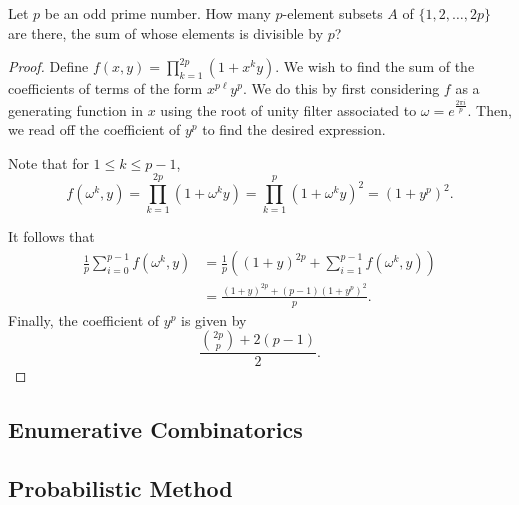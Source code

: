 \documentclass[11pt]{article}
\renewcommand{\>}{\rangle}
\newcommand{\<}{\langle}
\newcommand{\Var}{\operatorname{Var}}
\begin{document}
\begin{problem}[IMO 1995/6] Let $p$ be an odd prime number. How many $p$-element subsets $ A$ of $ \{1,2,\dots,2p\}$ are there, the sum of whose elements is divisible by $p$?
\end{problem}
\begin{proof}
Define $f(x, y) = \prod_{k=1}^{2p} (1 + x^k y)$.  We wish to find the sum of the coefficients of terms of the form $x^{p \ell} y^p$.  We do this by first considering $f$ as a generating function in $x$ using the root of unity filter associated to $\omega = e^{\frac{2\pi i }{p}}$.   Then, we read off the coefficient of $y^p$ to find the desired expression.

Note that for $1 \le k \le p-1$, 
$$f(\omega^k, y) = \prod_{k=1}^{2p} (1 + \omega^k y) = \prod_{k=1}^{p} (1 + \omega^k y)^2 = (1 + y^p)^2.$$

It follows that 
\begin{align*}
\frac{1}{p} \sum_{i=0}^{p-1} f(\omega^k, y) &= \frac{1}{p} \left ((1 +y)^{2p} + \sum_{i=1}^{p-1} f(\omega^k, y) \right) \\
&= \frac{(1 + y)^{2p} + (p-1)(1 + y^p)^2}{p}.
\end{align*}
Finally, the coefficient of $y^p$ is given by 
$$\frac{\binom{2p}{p} + 2(p-1)}{2}.$$
\end{proof}

\subsection{Enumerative Combinatorics}

\subsection{Probabilistic Method}


%
%
%
\end{document}
